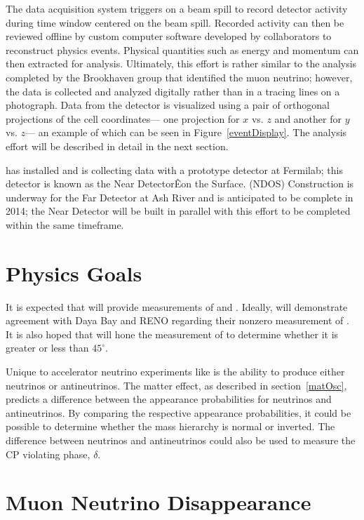 The data acquisition system triggers on a \numi beam spill to record detector activity during time window centered on the beam spill.  Recorded activity can then be reviewed offline by custom computer software developed by collaborators to reconstruct physics events.  Physical quantities such as energy and momentum can then extracted for analysis.  Ultimately, this effort is rather similar to the analysis completed by the Brookhaven group that identified the muon neutrino; however, the data is collected and analyzed digitally rather than in a tracing lines on a photograph.  Data from the detector is visualized using a pair of orthogonal projections of the cell coordinates--- one projection for $x$ vs. $z$  and another for $y$ vs. $z$--- an example of which can be seen in Figure~\ref{eventDisplay}.  The analysis effort will be described in detail in the next section.  

\nova has installed and is collecting data with a prototype detector at Fermilab; this detector is known as the Near DetectorÊon the Surface.  (NDOS)  Construction is underway for the Far Detector at Ash River and is anticipated to be complete in 2014; the Near Detector will be built in parallel with this effort to be completed within the same timeframe.  

\section{Physics Goals}
\label{goals}

It is expected that \nova will provide measurements of  \thetaoth and \thetatth.  Ideally, \nova will demonstrate agreement with Daya Bay and RENO regarding their nonzero measurement of \thetaoth.  It is also hoped that \nova will  hone the measurement of \thetatth to determine whether it is greater or less than $45^\circ$.  

Unique to accelerator neutrino experiments like \nova is the ability to produce either neutrinos or antineutrinos.  The matter effect, as described in section~\ref{matOsc}, predicts a difference between the appearance probabilities for neutrinos and antineutrinos.   By comparing the respective appearance probabilities, it could be possible to determine whether the mass hierarchy is normal or inverted.  The difference between neutrinos and antineutrinos could also be used to measure the CP violating phase, $\delta$.  

\section{Muon Neutrino Disappearance}

